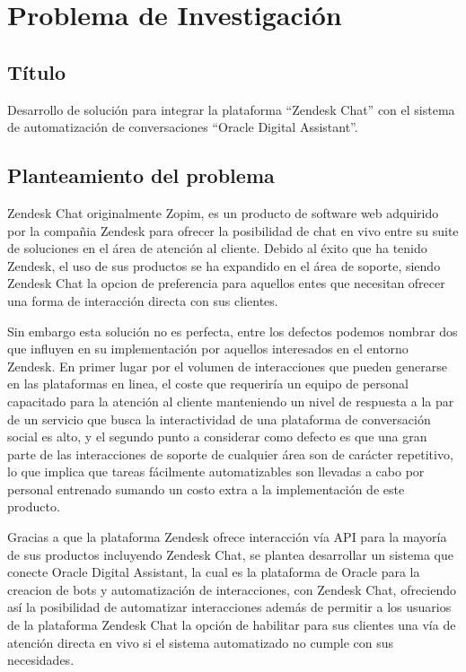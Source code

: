 \chapter{Problema de Investigación}

\section{Título}
Desarrollo de solución para integrar la plataforma ``Zendesk Chat''  con el sistema de automatización de conversaciones ``Oracle Digital Assistant''.

\section{Planteamiento del problema}
Zendesk Chat originalmente Zopim, es un producto de software web adquirido por la compañia Zendesk para ofrecer la posibilidad de chat en vivo entre su suite de soluciones en el área de atención al cliente. Debido al éxito que ha tenido Zendesk, el uso de sus productos se ha expandido en el área de soporte, siendo Zendesk Chat la opcion de preferencia para aquellos entes que necesitan ofrecer una forma de interacción directa con sus clientes.

Sin embargo esta solución no es perfecta, entre los defectos podemos nombrar dos que influyen en su implementación por aquellos interesados en el entorno Zendesk. En primer lugar por el volumen de interacciones que pueden generarse en las plataformas en linea, el coste que requeriría un equipo de personal capacitado para la atención al cliente manteniendo un nivel de respuesta a la par de un servicio que busca la interactividad de una plataforma de conversación social es alto, y el segundo punto a considerar como defecto es que una gran parte de las interacciones de soporte de cualquier área son de carácter repetitivo, lo que implica que tareas fácilmente automatizables son llevadas a cabo por personal entrenado sumando un costo extra a la implementación de este producto.

Gracias a que la plataforma Zendesk ofrece interacción vía API para la mayoría de sus productos incluyendo Zendesk Chat, se plantea desarrollar un sistema que conecte Oracle Digital Assistant, la cual es la plataforma de Oracle para la creacion de bots y automatización de interacciones, con Zendesk Chat, ofreciendo así la posibilidad de automatizar interacciones además de permitir a los usuarios de la plataforma Zendesk Chat la opción de habilitar para sus clientes una vía de atención directa en vivo si el sistema automatizado no cumple con sus necesidades.



